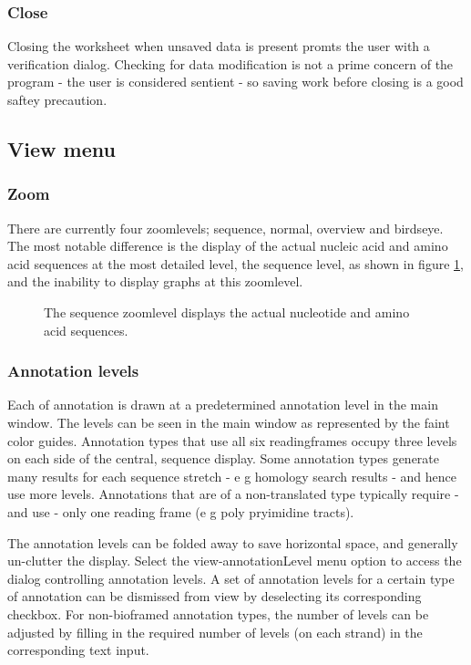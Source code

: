 \subsubsection{Close}
Closing the worksheet when unsaved data is present promts the user
with a verification dialog. Checking for data modification is not a
prime concern of the program - the user is considered sentient - so
saving work before closing is a good saftey precaution.

\subsection{View menu}
\subsubsection{Zoom}
There are currently four zoomlevels; sequence, normal, overview and
birdseye. The most notable difference is the display of the actual
nucleic acid and amino acid sequences at the most detailed level, the
sequence level, as shown in figure \ref{fig:GUIgenZoomseq}, and the
inability to display graphs at this zoomlevel.

\begin{figure}[htbp]
	\begin{center}
	\end{center}
\caption{The sequence zoomlevel displays the actual nucleotide and amino acid sequences.}
\label{fig:GUIgenZoomseq}
\end{figure}

\subsubsection{Annotation levels}
\label{sec:GUIviewAnnotationlevels}

Each of annotation is drawn at a predetermined annotation level in the
main window.  The levels can be seen in the main window as represented
by the faint color guides.  Annotation types that use all six
readingframes occupy three levels on each side of the central,
sequence display. Some annotation types generate many results for each
sequence stretch - e g homology search results - and hence use more
levels. Annotations that are of a non-translated type typically
require - and use - only one reading frame (e g poly pryimidine
tracts).

The annotation levels can be folded away to save horizontal space, and
generally un-clutter the display. Select the view-annotationLevel menu
option to access the dialog controlling annotation levels. A set of
annotation levels for a certain type of annotation can be dismissed
from view by deselecting its corresponding checkbox. For non-bioframed
annotation types, the number of levels can be adjusted by filling in
the required number of levels (on each strand) in the corresponding
text input.

